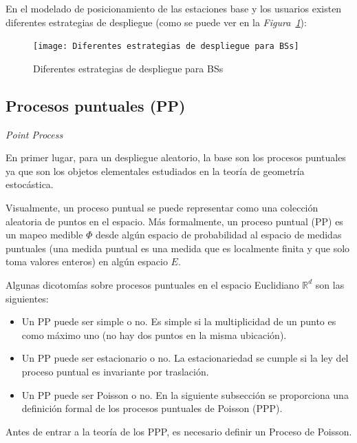 En el modelado de posicionamiento de las estaciones base y los usuarios existen diferentes estrategias de despliegue (como se puede ver en la \textit{Figura~\ref{fig:BSs}}):

\begin{figure}[th]
\centering
\texttt{[image: Diferentes estrategias de despliegue para BSs]}
\decoRule
\caption[Diferentes estrategias de despliegue para BSs]{Diferentes estrategias de despliegue para BSs}
\label{fig:BSs}
\end{figure}

\subsection{Procesos puntuales (PP)}
\textit{Point Process} \parencite{Haenggi2009}\newline

En primer lugar, para un despliegue aleatorio, la base son los procesos puntuales ya que son los objetos elementales estudiados en la teoría de geometría estocástica.\newline

Visualmente, un proceso puntual se puede representar como una colección aleatoria de puntos en el espacio. Más formalmente, un proceso puntual (PP) es un mapeo medible $\Phi$ desde algún espacio de probabilidad al espacio de medidas puntuales (una medida puntual es una medida que es localmente finita y que solo toma valores enteros) en algún espacio $E$.\newline

Algunas dicotomías sobre procesos puntuales en el espacio Euclidiano $\mathbb{R}^{d}$ son las siguientes:\newline

\begin{itemize}
    \item Un PP puede ser simple o no. Es simple si la multiplicidad de un punto es como máximo uno (no hay dos puntos en la misma ubicación).
    \item Un PP puede ser estacionario o no. La estacionariedad se cumple si la ley del proceso puntual es invariante por traslación.
    \item Un PP puede ser Poisson o no. En la siguiente subsección se proporciona una definición formal de los procesos puntuales de Poisson (PPP).
\end{itemize}

Antes de entrar a la teoría de los PPP, es necesario definir un Proceso de Poisson.

